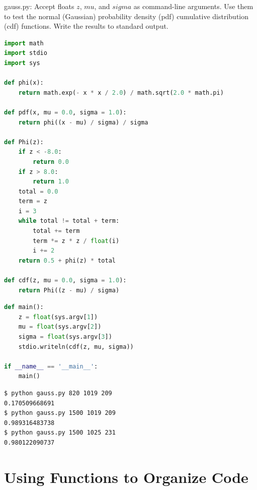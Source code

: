 \documentclass[8pt,a4paper,compress,handout]{beamer}
\begin{document}
\begin{frame}[fragile]
\begin{framed}
\tiny gauss.py: Accept floats $z$, $mu$, and $sigma$ as command-line arguments. Use them to test the normal (Gaussian) probability density (pdf) cumulative distribution (cdf) functions. Write the results to standard output.
\end{framed}

\begin{lstlisting}[language=Python]
import math
import stdio
import sys

def phi(x):
    return math.exp(- x * x / 2.0) / math.sqrt(2.0 * math.pi)

def pdf(x, mu = 0.0, sigma = 1.0):
    return phi((x - mu) / sigma) / sigma

def Phi(z):
    if z < -8.0:
        return 0.0
    if z > 8.0:
        return 1.0
    total = 0.0
    term = z
    i = 3
    while total != total + term:
        total += term
        term *= z * z / float(i)
        i += 2
    return 0.5 + phi(z) * total

def cdf(z, mu = 0.0, sigma = 1.0):
    return Phi((z - mu) / sigma)
\end{lstlisting}
\end{frame}

\begin{frame}[fragile]
\begin{lstlisting}[language=Python]
def main():
    z = float(sys.argv[1])
    mu = float(sys.argv[2])
    sigma = float(sys.argv[3])
    stdio.writeln(cdf(z, mu, sigma))

if __name__ == '__main__':
    main()
\end{lstlisting}

\begin{lstlisting}[language={}]
$ python gauss.py 820 1019 209
0.170509668691
$ python gauss.py 1500 1019 209
0.989316483738
$ python gauss.py 1500 1025 231
0.980122090737
\end{lstlisting}
\end{frame}

\section{Using Functions to Organize Code}
\end{document}
